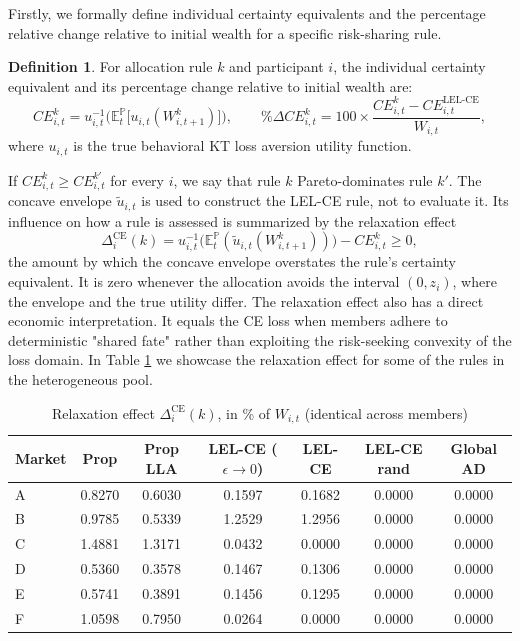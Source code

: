 \documentclass[11pt,a4paper]{article}
\theoremstyle{definition}
\newtheorem{definition}{Definition}[section]
\theoremstyle{plain}
\theoremstyle{remark}
\newcommand{\E}{\mathbb{E}}
\renewcommand{\P}{\mathbb{P}}
\newcommand{\1}{\mathbf{1}}
\begin{document}
Firstly, we formally define individual certainty equivalents and the percentage relative change relative to initial wealth for a specific risk-sharing rule.
\begin{definition}
    For allocation rule $k$ and participant $i$, the individual certainty equivalent and its percentage change relative to initial wealth are:
    \begin{equation}
        CE_{i,t}^k = u_{i,t}^{-1}\Big( \E_t^{\P}\big[u_{i,t}(W_{i,t+1}^k)\big] \Big), \qquad \%\Delta CE_{i,t}^k = 100 \times \frac{CE_{i,t}^k - CE_{i,t}^{\text{LEL-CE}}}{W_{i,t}},
    \end{equation}
    where $u_{i,t}$ is the true behavioral KT loss aversion utility function.
\end{definition}
If $CE_{i,t}^k \geq CE_{i,t}^{k'}$ for every $i$, we say that rule $k$ Pareto-dominates rule $k'$. The concave envelope $\tilde{u}_{i,t}$ is used to construct the LEL-CE rule, not to evaluate it. Its influence on how a rule is assessed is summarized by the relaxation effect
\begin{equation*}
    \Delta_i^{\text{CE}}(k) = u_{i,t}^{-1}\Big(\E_t^\P(\tilde{u}_{i,t}(W_{i,t+1}^k))\Big) - CE_{i,t}^k \geq 0,
\end{equation*}
the amount by which the concave envelope overstates the rule's certainty equivalent. It is zero whenever the allocation avoids the interval $(0, z_i)$, where the envelope and the true utility differ. The relaxation effect also has a direct economic interpretation. It equals the CE loss when members adhere to deterministic "shared fate" rather than exploiting the risk-seeking convexity of the loss domain. In Table \ref{tab:relaxation_effect} we showcase the relaxation effect for some of the rules in the heterogeneous pool.
\begin{table}[htbp]
  \centering
  \small
  \caption{Relaxation effect $\Delta_i^{\text{CE}}(k)$, in \% of $W_{i,t}$ (identical across members)}
  \label{tab:relaxation_effect}
  \vspace{0.5em}
  \begin{tabular*}{\textwidth}{@{\extracolsep{\fill}} l cccccc @{}}
    \toprule
    \textbf{Market} & \textbf{Prop} & \textbf{Prop LLA} & \textbf{LEL-CE ($\epsilon \to 0$)} & \textbf{LEL-CE} & \textbf{LEL-CE rand} & \textbf{Global AD} \\
    \midrule
    A & 0.8270 & 0.6030 & 0.1597 & 0.1682 & 0.0000 & 0.0000 \\
    B & 0.9785 & 0.5339 & 1.2529 & 1.2956 & 0.0000 & 0.0000 \\
    C & 1.4881 & 1.3171 & 0.0432 & 0.0000 & 0.0000 & 0.0000 \\
    D & 0.5360 & 0.3578 & 0.1467 & 0.1306 & 0.0000 & 0.0000 \\
    E & 0.5741 & 0.3891 & 0.1456 & 0.1295 & 0.0000 & 0.0000 \\
    F & 1.0598 & 0.7950 & 0.0264 & 0.0000 & 0.0000 & 0.0000 \\
    \bottomrule
  \end{tabular*}
\end{table}
\end{document}
